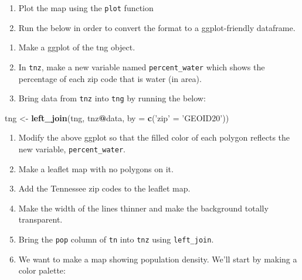 \documentclass[]{book}
\newenvironment{Shaded}{\begin{snugshade}}{\end{snugshade}}
\newcommand{\DataTypeTok}[1]{\textcolor[rgb]{0.13,0.29,0.53}{#1}}
\newcommand{\KeywordTok}[1]{\textcolor[rgb]{0.13,0.29,0.53}{\textbf{#1}}}
\newcommand{\NormalTok}[1]{#1}
\newcommand{\OperatorTok}[1]{\textcolor[rgb]{0.81,0.36,0.00}{\textbf{#1}}}
\newcommand{\StringTok}[1]{\textcolor[rgb]{0.31,0.60,0.02}{#1}}
\begin{document}
\begin{enumerate}
\def\labelenumi{\arabic{enumi}.}
\setcounter{enumi}{10}
\item
  Plot the map using the \texttt{plot} function
\item
  Run the below in order to convert the format to a ggplot-friendly dataframe.
\end{enumerate}

\begin{Shaded}
\end{Shaded}

\begin{enumerate}
\def\labelenumi{\arabic{enumi}.}
\setcounter{enumi}{12}
\item
  Make a ggplot of the tng object.
\item
  In \texttt{tnz}, make a new variable named \texttt{percent\_water} which shows the percentage of each zip code that is water (in area).
\item
  Bring data from \texttt{tnz} into \texttt{tng} by running the below:
\end{enumerate}

\begin{Shaded}
\begin{Highlighting}[]
\NormalTok{tng <-}\StringTok{ }\KeywordTok{left_join}\NormalTok{(tng, tnz}\OperatorTok{@}\NormalTok{data, }\DataTypeTok{by =} \KeywordTok{c}\NormalTok{(}\StringTok{'zip'}\NormalTok{ =}\StringTok{ 'GEOID20'}\NormalTok{))}
\end{Highlighting}
\end{Shaded}

\begin{enumerate}
\def\labelenumi{\arabic{enumi}.}
\setcounter{enumi}{15}
\item
  Modify the above ggplot so that the filled color of each polygon reflects the new variable, \texttt{percent\_water}.
\item
  Make a leaflet map with no polygons on it.
\item
  Add the Tennessee zip codes to the leaflet map.
\item
  Make the width of the lines thinner and make the background totally transparent.
\item
  Bring the \texttt{pop} column of \texttt{tn} into \texttt{tnz} using \texttt{left\_join}.
\item
  We want to make a map showing population density. We'll start by making a color palette:
\end{enumerate}
\end{document}
